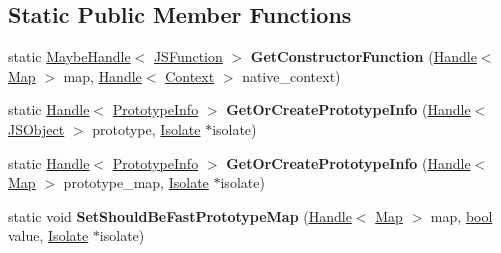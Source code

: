\subsection*{Static Public Member Functions}
\begin{DoxyCompactItemize}
\item 
\mbox{\label{classv8_1_1internal_1_1Map_aec39f61fb942c137611b696e8160ccf3}} 
static \mbox{\hyperlink{classv8_1_1internal_1_1MaybeHandle}{Maybe\+Handle}}$<$ \mbox{\hyperlink{classv8_1_1internal_1_1JSFunction}{J\+S\+Function}} $>$ {\bfseries Get\+Constructor\+Function} (\mbox{\hyperlink{classv8_1_1internal_1_1Handle}{Handle}}$<$ \mbox{\hyperlink{classv8_1_1internal_1_1Map}{Map}} $>$ map, \mbox{\hyperlink{classv8_1_1internal_1_1Handle}{Handle}}$<$ \mbox{\hyperlink{classv8_1_1internal_1_1Context}{Context}} $>$ native\+\_\+context)
\item 
\mbox{\label{classv8_1_1internal_1_1Map_ad46f71a48ede55c74fa437f86c4e7d5a}} 
static \mbox{\hyperlink{classv8_1_1internal_1_1Handle}{Handle}}$<$ \mbox{\hyperlink{classv8_1_1internal_1_1PrototypeInfo}{Prototype\+Info}} $>$ {\bfseries Get\+Or\+Create\+Prototype\+Info} (\mbox{\hyperlink{classv8_1_1internal_1_1Handle}{Handle}}$<$ \mbox{\hyperlink{classv8_1_1internal_1_1JSObject}{J\+S\+Object}} $>$ prototype, \mbox{\hyperlink{classv8_1_1internal_1_1Isolate}{Isolate}} $\ast$isolate)
\item 
\mbox{\label{classv8_1_1internal_1_1Map_ab604d3bbf94c9e677e6985d811d6e291}} 
static \mbox{\hyperlink{classv8_1_1internal_1_1Handle}{Handle}}$<$ \mbox{\hyperlink{classv8_1_1internal_1_1PrototypeInfo}{Prototype\+Info}} $>$ {\bfseries Get\+Or\+Create\+Prototype\+Info} (\mbox{\hyperlink{classv8_1_1internal_1_1Handle}{Handle}}$<$ \mbox{\hyperlink{classv8_1_1internal_1_1Map}{Map}} $>$ prototype\+\_\+map, \mbox{\hyperlink{classv8_1_1internal_1_1Isolate}{Isolate}} $\ast$isolate)
\item 
\mbox{\label{classv8_1_1internal_1_1Map_a152afa9d95e118a4de4e3db48840b8bb}} 
static void {\bfseries Set\+Should\+Be\+Fast\+Prototype\+Map} (\mbox{\hyperlink{classv8_1_1internal_1_1Handle}{Handle}}$<$ \mbox{\hyperlink{classv8_1_1internal_1_1Map}{Map}} $>$ map, \mbox{\hyperlink{classbool}{bool}} value, \mbox{\hyperlink{classv8_1_1internal_1_1Isolate}{Isolate}} $\ast$isolate)

\end{DoxyCompactItemize}
